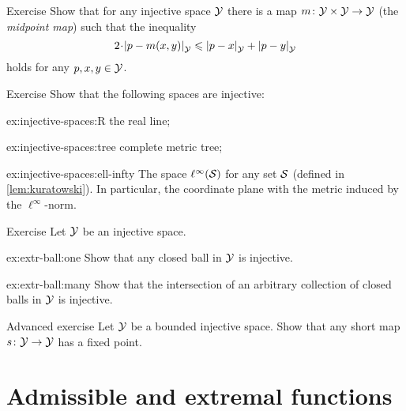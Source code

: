 \begin{thm}{Exercise}\label{ex:bicombing}
Show that for any injective space $\mathcal{Y}$ there is a map $m\colon\mathcal{Y}\times\mathcal{Y}\to\mathcal{Y}$ (the \emph{midpoint map}) such that the inequality
\[2\cdot \dist{p}{m(x,y)}{\spc{Y}}\le\dist{p}{x}{\spc{Y}}+\dist{p}{y}{\spc{Y}}\]
holds for any $p,x,y\in \mathcal{Y}$.
\end{thm}

\begin{thm}{Exercise}\label{ex:injective-spaces}
Show that the following spaces are injective:
\begin{subthm}{ex:injective-spaces:R}
the real line;
\end{subthm}

\begin{subthm}{ex:injective-spaces:tree}
complete metric tree;
\end{subthm}

\begin{subthm}{ex:injective-spaces:ell-infty}
The space $\ell^\infty(\mathcal{S})$ for any set $\mathcal{S}$ (defined in \ref{lem:kuratowski}).
In particular, the coordinate plane with the metric induced by the $\ell^\infty$-norm.
\end{subthm}

\end{thm}

\begin{thm}{Exercise}\label{ex:extr-ball}
Let $\mathcal{Y}$ be an injective space.

\begin{subthm}{ex:extr-ball:one}
Show that any closed ball in $\mathcal{Y}$ is injective.
\end{subthm}

\begin{subthm}{ex:extr-ball:many}
Show that the intersection of an arbitrary collection of closed balls in $\mathcal{Y}$ is injective.
\end{subthm}

\end{thm}

\begin{thm}{Advanced exercise}\label{ex:extr-fixed}
Let $\mathcal{Y}$ be a bounded injective space.
Show that any short map $s\colon\mathcal{Y}\to\mathcal{Y}$ has a fixed point. 
\end{thm}


\section{Admissible and extremal functions}

